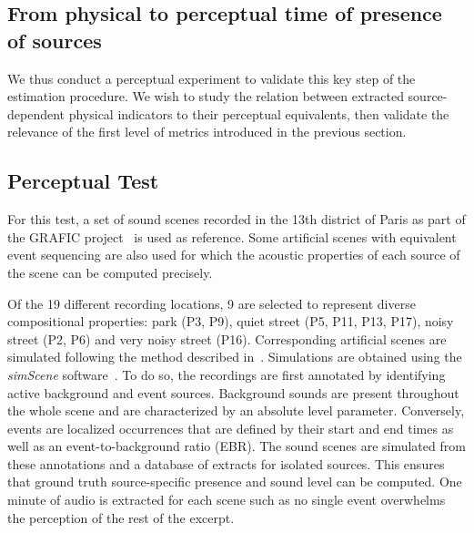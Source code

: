 \documentclass{article}
\begin{document}
\begin{sloppy}
\section{From physical to perceptual time of presence of sources}
\label{sec:val}

We thus conduct a perceptual experiment to validate this key step of the estimation procedure. We wish to study the relation between extracted source-dependent physical indicators to their perceptual equivalents, then validate the relevance of the first level of metrics introduced in the previous section.

\subsection{Perceptual Test}

For this test, a set of sound scenes recorded in the 13th district of Paris as part of the GRAFIC project~\cite{aumond2017} is used as reference. Some artificial scenes with equivalent event sequencing are also used for which the acoustic properties of each source of the scene can be computed precisely.

Of the 19 different recording locations, 9 are selected to represent diverse compositional properties: park (P3, P9), quiet street (P5, P11, P13, P17), noisy street (P2, P6) and very noisy street (P16). Corresponding artificial scenes are simulated following the method described in~\cite{gloaguen2017}. Simulations are obtained using the \textit{simScene} software~\cite{lafay:hal-01111381}. To do so, the recordings are first annotated by identifying active background and event sources. Background sounds are present throughout the whole scene and are characterized by an absolute level parameter. Conversely, events are localized occurrences that are defined by their start and end times as well as an event-to-background ratio (EBR). The sound scenes are simulated from these annotations and a database of extracts for isolated sources. This ensures that ground truth source-specific presence and sound level can be computed. One minute of audio is extracted for each scene such as no single event overwhelms the perception of the rest of the excerpt.


\end{sloppy}
\end{document}

